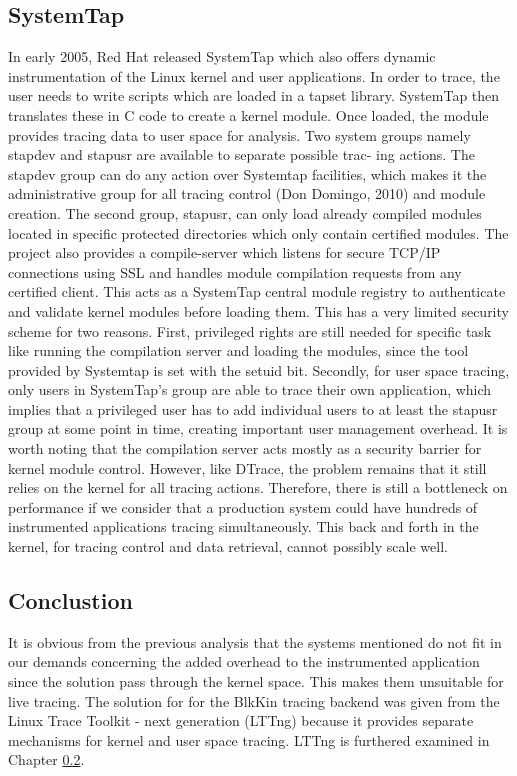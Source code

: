 \subsection{SystemTap}
In early 2005, Red Hat released SystemTap \cite{systemtap} which also
offers dynamic instrumentation of the Linux kernel and user applications. In
order to trace, the user needs to write scripts which are loaded in a tapset
library. SystemTap then translates these in C code to create a kernel module.
Once loaded, the module provides tracing data to user space for analysis.
Two system groups namely stapdev and stapusr are available to separate possible
trac- ing actions. The stapdev group can do any action over Systemtap
facilities, which makes it the administrative group for all tracing control (Don
Domingo, 2010) and module creation.
The second group, stapusr, can only load already compiled modules located in
specific protected directories which only contain certified modules.
The project also provides a compile-server which listens for secure TCP/IP
connections using SSL and handles module compilation requests from any certified
client. This acts as a SystemTap central module registry to authenticate and
validate kernel modules before loading them.
This has a very limited security scheme for two reasons. First, privileged
rights are still needed for specific task like running the compilation server
and loading the modules, since the tool provided by Systemtap is set with the
setuid bit. Secondly, for user space tracing, only users in SystemTap’s group
are able to trace their own application, which implies that a privileged user
has to add individual users to at least the stapusr group at some point in time,
creating important user management overhead.
It is worth noting that the compilation server acts mostly as a security barrier
for kernel module control. However, like DTrace, the problem remains that it
still relies on the kernel for all tracing actions. Therefore, there is still a
bottleneck on performance if we consider that a production system could have
hundreds of instrumented applications tracing simultaneously. This back and
forth in the kernel, for tracing control and data retrieval, cannot possibly
scale well.

\subsection{Conclustion}
It is obvious from the previous analysis that the systems mentioned do not fit
in our demands concerning the added overhead to the instrumented application
since the solution pass through the kernel space. This makes them unsuitable for
live tracing. The solution for for the BlkKin tracing backend was given from the
Linux Trace Toolkit - next generation (LTTng) because it provides separate
mechanisms for kernel and user space tracing. LTTng is furthered examined in
Chapter \ref{}.   


